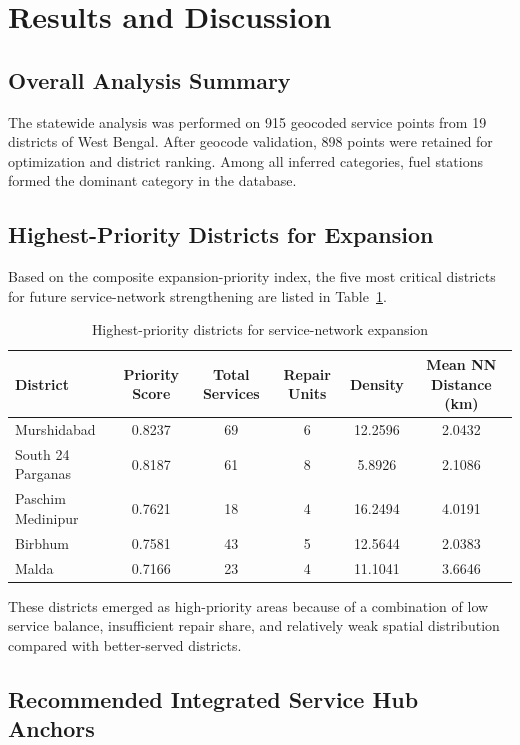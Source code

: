 \section{Results and Discussion}

\subsection{Overall Analysis Summary}

The statewide analysis was performed on 915 geocoded service points from 19 districts of West Bengal. After geocode validation, 898 points were retained for optimization and district ranking. Among all inferred categories, fuel stations formed the dominant category in the database.

\subsection{Highest-Priority Districts for Expansion}

Based on the composite expansion-priority index, the five most critical districts for future service-network strengthening are listed in Table~\ref{tab:priority_districts}.

\begin{table}[h!]
\centering
\caption{Highest-priority districts for service-network expansion}
\label{tab:priority_districts}
\begin{tabular}{|l|c|c|c|c|c|}
\hline
\textbf{District} & \textbf{Priority Score} & \textbf{Total Services} & \textbf{Repair Units} & \textbf{Density} & \textbf{Mean NN Distance (km)} \\
\hline
Murshidabad & 0.8237 & 69 & 6 & 12.2596 & 2.0432 \\
South 24 Parganas & 0.8187 & 61 & 8 & 5.8926 & 2.1086 \\
Paschim Medinipur & 0.7621 & 18 & 4 & 16.2494 & 4.0191 \\
Birbhum & 0.7581 & 43 & 5 & 12.5644 & 2.0383 \\
Malda & 0.7166 & 23 & 4 & 11.1041 & 3.6646 \\
\hline
\end{tabular}
\end{table}

These districts emerged as high-priority areas because of a combination of low service balance, insufficient repair share, and relatively weak spatial distribution compared with better-served districts.

\subsection{Recommended Integrated Service Hub Anchors}

